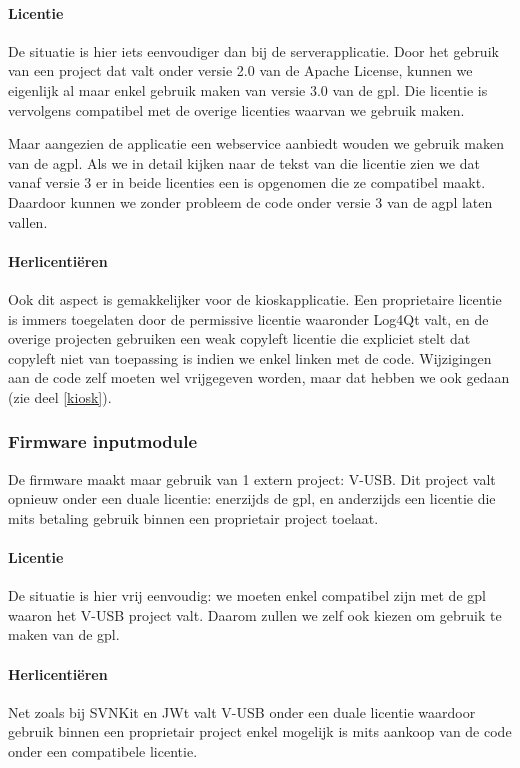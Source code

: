\paragraph{Licentie} De situatie is hier iets eenvoudiger dan bij de serverapplicatie. Door het gebruik van een project dat valt onder versie 2.0 van de Apache License, kunnen we eigenlijk al maar enkel gebruik maken van versie 3.0 van de \ac{gpl}. Die licentie is vervolgens compatibel met de overige licenties waarvan we gebruik maken.

Maar aangezien de applicatie een webservice aanbiedt wouden we gebruik maken van de \ac{agpl}. Als we in detail kijken naar de tekst van die licentie zien we dat vanaf versie 3 er in beide licenties een  is opgenomen die ze compatibel maakt. Daardoor kunnen we zonder probleem de code onder versie 3 van de \ac{agpl} laten vallen.

\paragraph{Herlicentiëren} Ook dit aspect is gemakkelijker voor de kioskapplicatie. Een proprietaire licentie is immers toegelaten door de permissive licentie waaronder Log4Qt valt, en de overige projecten gebruiken een weak copyleft licentie die expliciet stelt dat copyleft niet van toepassing is indien we enkel linken met de code. Wijzigingen aan de code zelf moeten wel vrijgegeven worden, maar dat hebben we ook gedaan (zie deel \ref{kiosk}).

\subsubsection{Firmware inputmodule}

De firmware maakt maar gebruik van 1 extern project: V-USB. Dit project valt opnieuw onder een duale licentie: enerzijds de \ac{gpl}, en anderzijds een licentie die mits betaling gebruik binnen een proprietair project toelaat.

\paragraph{Licentie} De situatie is hier vrij eenvoudig: we moeten enkel compatibel zijn met de \ac{gpl} waaron het V-USB project valt. Daarom zullen we zelf ook kiezen om gebruik te maken van de \ac{gpl}.

\paragraph{Herlicentiëren} Net zoals bij SVNKit en JWt valt V-USB onder een duale licentie waardoor gebruik binnen een proprietair project enkel mogelijk is mits aankoop van de code onder een compatibele licentie.

